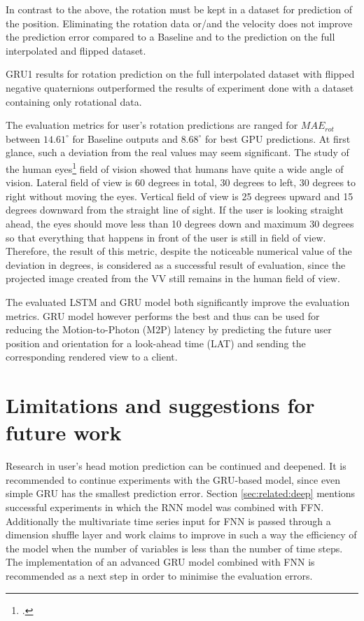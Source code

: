 In contrast to the above, the rotation must be kept in a dataset for prediction of the position. Eliminating the rotation data or/and the velocity does not improve the prediction error compared to a Baseline and to the prediction on the full interpolated and flipped dataset.  

GRU1 results for rotation prediction on the full interpolated dataset with flipped negative quaternions outperformed the results of experiment done with a dataset containing only rotational data. 

The evaluation metrics for user's rotation predictions are ranged for $MAE_{rot}$ between $14.61^{\circ}$ for Baseline outputs and $8.68^{\circ}$ for best GPU predictions. At first glance, such a deviation from the real values may seem significant. The study of the human eyes\footcite{https://medium.com/@catalin.macovei/positioning-of-infotainment-screen-in-cars-e4cffa1e5697} field of vision showed that humans have quite a wide angle of vision. Lateral field of view is 60 degrees in total, 30 degrees to left, 30 degrees to right without moving the eyes. Vertical field of view is 25 degrees upward and 15 degrees downward from the straight line of sight. If the user is looking straight ahead, the eyes should move less than 10 degrees down and maximum 30 degrees so that everything that happens in front of the user is still in field of view. Therefore, the result of this metric, despite the noticeable numerical value of the deviation in degrees, is considered as a successful result of evaluation, since the projected image created from the VV still remains in the human field of view.

The evaluated LSTM and GRU model both significantly improve the evaluation metrics. GRU model however performs the best and thus can be used for reducing the Motion-to-Photon (M2P) latency by predicting the future user position and orientation for a look-ahead time (LAT) and sending the corresponding rendered view to a client.

\section{Limitations and suggestions for future work}
\label{sec:conclusion:future}
Research in user's head motion prediction can be continued and deepened. It is recommended to continue experiments with the GRU-based model, since even simple GRU has the smallest prediction error. Section \ref{sec:related:deep} mentions successful experiments in which the RNN model was combined with FFN. Additionally the multivariate time series input for FNN is passed through a dimension shuffle layer and work \cite{lstm_fcn} claims to improve in such a way the efficiency of the model when the number of variables is less than the number of time steps. The implementation of an advanced GRU model combined with FNN is recommended as a next step in order to minimise the evaluation errors. 

